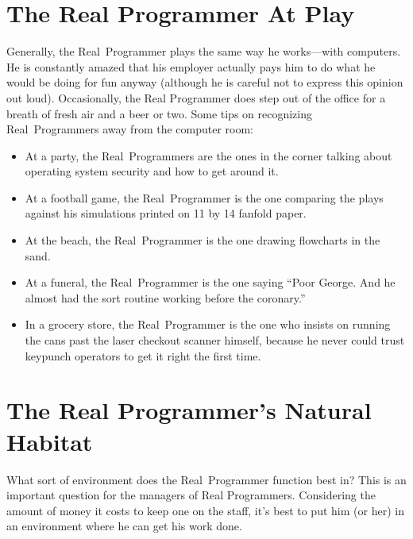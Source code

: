 \documentclass[10pt,letterpaper]{article}
\begin{document}
\section*{The Real Programmer At Play}
Generally, the Real~Programmer plays the same way he works---with
computers. He is constantly amazed that his employer actually pays him
to do what he would be doing for fun anyway (although he is careful
not to express this opinion out loud). Occasionally, the Real
Programmer does step out of the office for a breath of fresh air and a
beer or two. Some tips on recognizing Real~Programmers away from the
computer room:
\begin{itemize}
\item At a party, the Real~Programmers are the ones in the corner talking about operating system security and how to get around it.
\item At a football game, the Real~Programmer is the one comparing the plays against his simulations printed on 11 by 14 fanfold paper.
\item At the beach, the Real~Programmer is the one drawing flowcharts in the sand.
\item At a funeral, the Real~Programmer is the one saying ``Poor George. And he almost had the sort routine working before the coronary.''
\item In a grocery store, the Real~Programmer is the one who insists on running the cans past the laser checkout scanner himself, because he never could trust keypunch operators to get it right the first time.
\end{itemize}

\section*{The Real Programmer's Natural Habitat}
What sort of environment does the Real~Programmer function best in?
This is an important question for the managers of Real
Programmers. Considering the amount of money it costs to keep one on
the staff, it's best to put him (or her) in an environment where he
can get his work done.
\end{document}
